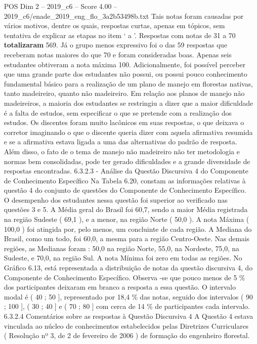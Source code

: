 \begin{textsample}{POS Dim 2 – 2019\_c6 – Score 4.00 – 2019\_c6/enade\_2019\_eng\_flo\_3a2b53498b.txt}
Tais notas foram causadas por vários motivos, dentre os quais, respostas curtas, apenas em tópicos, sem tentativa de explicar as etapas no item ‘ a ’.
Respostas com notas de 31 a 70 \textbf{totalizaram} 569.
Já o grupo menos expressivo foi o das 59 respostas que receberam notas maiores do que 70 e foram consideradas boas.
Apenas seis estudantes obtiveram a nota máxima 100.
Adicionalmente, foi possível perceber que uma grande parte dos estudantes não possui, ou possui pouco conhecimento fundamental básico para a realização de um plano de manejo em florestas nativas, tanto madeireiro, quanto não madeireiro.
Em relação aos planos de manejo não madeireiros, a maioria dos estudantes se restringiu a dizer que a maior dificuldade é a falta de estudos, sem especificar o que se pretende com a realização dos estudos.
Os discentes foram muito lacônicos em suas respostas, o que deixava o corretor imaginando o que o discente queria dizer com aquela afirmativa resumida e se a afirmativa estava ligada a uma das alternativas do padrão de resposta.
Além disso, o fato de o tema de manejo não madeireiro não ter metodologia e normas bem consolidadas, pode ter gerado dificuldades e a grande diversidade de respostas encontradas. 6.3.2.3 - Análise da Questão Discursiva 4 do Componente de Conhecimento Específico Na Tabela 6.20, constam as informações relativas à questão 4 do conjunto de questões do Componente de Conhecimento Específico.
O desempenho dos estudantes nessa questão foi superior ao verificado nas questões 3 e 5.
A Média geral do Brasil foi 60,7, sendo a maior Média registrada na região Sudeste ( 69,1 ), e a menor, na região Norte ( 50,0 ).
A nota Máxima ( 100,0 ) foi atingida por, pelo menos, um concluinte de cada região.
A Mediana do Brasil, como um todo, foi 60,0, a mesma para a região Centro-Oeste.
Nas demais regiões, as Medianas foram : 50,0 na região Norte, 55,0, na Nordeste, 75,0, na Sudeste, e 70,0, na região Sul.
A nota Mínima foi zero em todas as regiões.
No Gráfico 6.13, está representada a distribuição de notas da questão discursiva 4, do Componente de Conhecimento Específico.
Observa -se que pouco menos de 5 \% dos participantes deixaram em branco a resposta a essa questão.
O intervalo modal é ( 40 ; 50 ], representado por 18,4 \% das notas, seguido dos intervalos ( 90 ; 100 ], ( 30 ; 40 ] e ( 70 ; 80 ] com cerca de 14 \% de participantes cada intervalo. 6.3.2.4 Comentários sobre as respostas à Questão Discursiva 4 A Questão 4 estava vinculada ao núcleo de conhecimentos estabelecidos pelas Diretrizes Curriculares ( Resolução nº 3, de 2 de fevereiro de 2006 ) de formação do engenheiro florestal.

\end{textsample}
